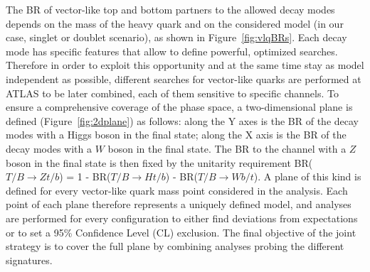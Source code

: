 
The BR of vector-like top and bottom partners to the allowed decay modes depends
on the mass of the heavy quark and on the considered model (in our case, singlet or doublet
scenario), as shown in Figure~\ref{fig:vlqBRs}.
Each decay mode has specific features that allow to define powerful, optimized searches.
Therefore in order to exploit this opportunity and at the same time stay as model independent
as possible, different searches for vector-like quarks are performed at ATLAS
to be later combined, each of them sensitive to specific channels.
To ensure a comprehensive coverage of the phase space, a two-dimensional plane is defined 
(Figure~\ref{fig:2dplane}) as follows:
along the Y axes is the BR of the decay 
modes with a Higgs boson in the final state; along the X axis is the BR 
of the decay modes with a $W$ boson in the final state.
The BR to the channel with a $Z$ boson in the final state is then fixed by the 
unitarity requirement BR($T/B\to  Zt/b$) = 1 - BR($T/B\to Ht/b$) - BR($T/B\to Wb/t$).
A plane of this kind is defined for every vector-like quark mass point considered 
in the analysis. Each point of each plane therefore represents a 
uniquely defined model, and analyses are performed for every configuration
to either find deviations from expectations or to set a 95\% Confidence Level (CL) exclusion.
The final objective of the joint strategy is to cover the full plane by combining
analyses probing the different signatures.

